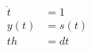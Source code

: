 \documentclass[10pt]{article}
\begin{document}
\begin{align*}\dot{t} &= 1 \\
y(t) &= s(t) \\
th &= dt\end{align*}
\end{document}
